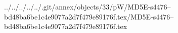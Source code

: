 ../../../../../.git/annex/objects/33/pW/MD5E-s4476--bd48ba6be1c4e9077a2d7f479e89176f.tex/MD5E-s4476--bd48ba6be1c4e9077a2d7f479e89176f.tex